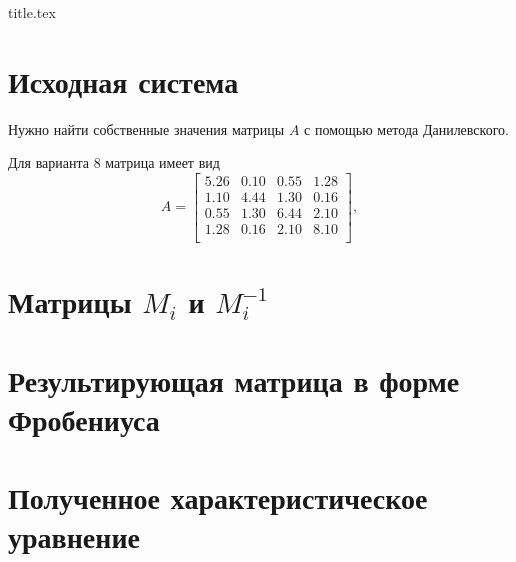 




{title.tex}

\clearpage


\pagestyle{empty}
\thispagestyle{empty}
\tableofcontents

\clearpage
{}
\pagestyle{fancy}
\setcounter{page}{2}

\clearpage

\chapter{Исходная система}

Нужно найти собственные значения матрицы $A$ с помощью метода Данилевского.

Для варианта 8 матрица имеет вид
\begin{equation*}
A =
\begin{bmatrix}
    5.26 & 0.10 & 0.55 & 1.28 \\
    1.10 & 4.44 & 1.30 & 0.16 \\
    0.55 & 1.30 & 6.44 & 2.10 \\
    1.28 & 0.16 & 2.10 & 8.10 \\
\end{bmatrix},
\end{equation*}

\chapter{Матрицы $M_i$ и $M_i^{-1}$}

\lstset{inputencoding=utf8, extendedchars=\true}


\chapter{Результирующая матрица в форме Фробениуса}

\lstset{inputencoding=utf8, extendedchars=\true}


\chapter{Полученное характеристическое уравнение}

